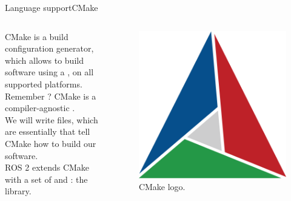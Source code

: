 \begin{frame}{Language support}{CMake}
  \begin{columns}
    CMake is a  build configuration generator, which allows to build software using a ,  on all supported platforms.\\
    Remember ? CMake is a compiler-agnostic .\\
    \bigskip
    We will write  files, which are essentially  that tell CMake how to build our software.\\
    \bigskip
    ROS 2 extends CMake with a set of  and : the \href{https://docs.ros.org/en/jazzy/How-To-Guides/Ament-CMake-Documentation.html}{} library.

    \begin{figure}
      \centering
      \includegraphics[width=.7\textwidth]{cmake}
      \caption{CMake logo.}
      \label{fig:cmake}
    \end{figure}
  \end{columns}
\end{frame}
